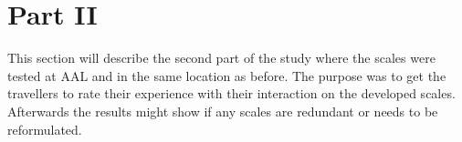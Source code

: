 \section{Part II}
This section will describe the second part of the study where the scales were tested at AAL and in the same location as before. The purpose was to get the travellers to rate their experience with their interaction on the developed scales. Afterwards the results might show if any scales are redundant or needs to be reformulated.



%
%
%
%